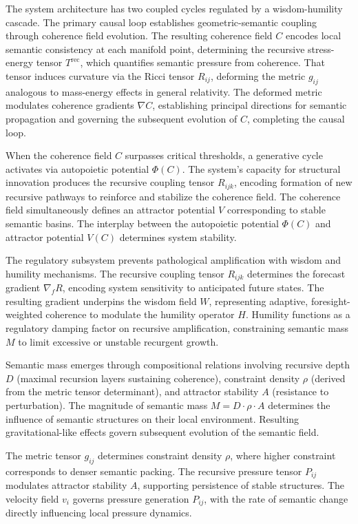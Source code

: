 The system architecture has two coupled cycles regulated by a wisdom-humility cascade. The primary causal loop establishes geometric-semantic coupling through coherence field evolution. The resulting coherence field $C$ encodes local semantic consistency at each manifold point, determining the recursive stress-energy tensor $T^{\text{rec}}$, which quantifies semantic pressure from coherence. That tensor induces curvature via the Ricci tensor $R_{ij}$, deforming the metric $g_{ij}$ analogous to mass-energy effects in general relativity. The deformed metric modulates coherence gradients $\nabla C$, establishing principal directions for semantic propagation and governing the subsequent evolution of $C$, completing the causal loop.

When the coherence field $C$ surpasses critical thresholds, a generative cycle activates via autopoietic potential $\Phi(C)$. The system's capacity for structural innovation produces the recursive coupling tensor $R_{ijk}$, encoding formation of new recursive pathways to reinforce and stabilize the coherence field. The coherence field simultaneously defines an attractor potential $V$ corresponding to stable semantic basins. The interplay between the autopoietic potential $\Phi(C)$ and attractor potential $V(C)$ determines system stability.

The regulatory subsystem prevents pathological amplification with wisdom and humility mechanisms. The recursive coupling tensor $R_{ijk}$ determines the forecast gradient $\nabla_f R$, encoding system sensitivity to anticipated future states. The resulting gradient underpins the wisdom field $W$, representing adaptive, foresight-weighted coherence to modulate the humility operator $H$. Humility functions as a regulatory damping factor on recursive amplification, constraining semantic mass $M$ to limit excessive or unstable recurgent growth.

Semantic mass emerges through compositional relations involving recursive depth $D$ (maximal recursion layers sustaining coherence), constraint density $\rho$ (derived from the metric tensor determinant), and attractor stability $A$ (resistance to perturbation). The magnitude of semantic mass $M = D \cdot \rho \cdot A$ determines the influence of semantic structures on their local environment. Resulting gravitational-like effects govern subsequent evolution of the semantic field.

The metric tensor $g_{ij}$ determines constraint density $\rho$, where higher constraint corresponds to denser semantic packing. The recursive pressure tensor $P_{ij}$ modulates attractor stability $A$, supporting persistence of stable structures. The velocity field $v_i$ governs pressure generation $P_{ij}$, with the rate of semantic change directly influencing local pressure dynamics.

